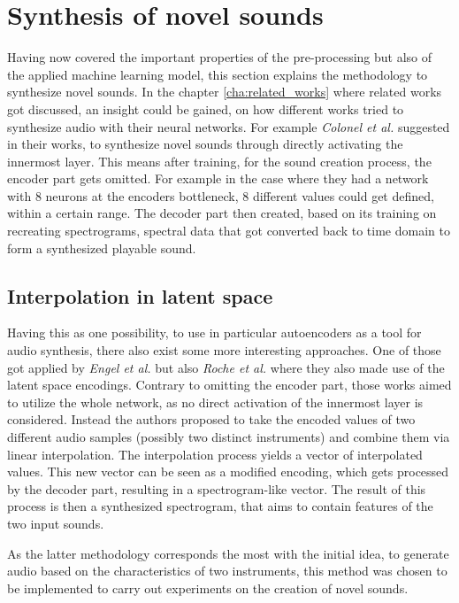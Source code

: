 \section{Synthesis of novel sounds}
\label{sec:app_interpolation}
Having now covered the important properties of the pre-processing but also of the applied machine learning model, this section explains the methodology to synthesize novel sounds. In the chapter \ref{cha:related_works} where related works got discussed, an insight could be gained, on how different works tried to synthesize audio with their neural networks. For example \textit{Colonel et al.}\cite{colonel2017improving, colonel2018autoencoding, Colonel2020} suggested in their works, to synthesize novel sounds through directly activating the innermost layer. This means after training, for the sound creation process, the encoder part gets omitted. For example in the case where they had a network with 8 neurons at the encoders bottleneck, 8 different values could get defined, within a certain range. The decoder part then created, based on its training on recreating spectrograms, spectral data that got converted back to time domain to form a synthesized playable sound. 

\subsection{Interpolation in latent space}
Having this as one possibility, to use in particular autoencoders as a tool for audio synthesis, there also exist some more interesting approaches. One of those got applied by \textit{Engel et al.} \cite{Engel2017} but also \textit{Roche et al.} \cite{roche2019autoencoders} where they also made use of the latent space encodings. Contrary to omitting the encoder part, those works aimed to utilize the whole network, as no direct activation of the innermost layer is considered. Instead the authors proposed to take the encoded values of two different audio samples (possibly two distinct instruments) and combine them via linear interpolation. The interpolation process yields a vector of interpolated values. This new vector can be seen as a modified encoding, which gets processed by the decoder part, resulting in a spectrogram-like vector. The result of this process is then a synthesized spectrogram, that aims to contain features of the two input sounds.

As the latter methodology corresponds the most with the initial idea, to generate audio based on the characteristics of two instruments, this method was chosen to be implemented to carry out experiments on the creation of novel sounds.

